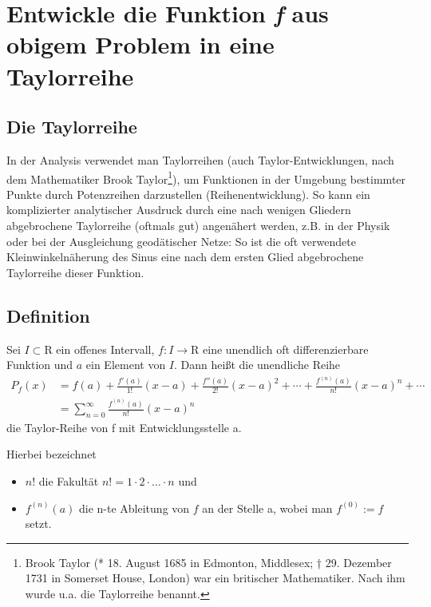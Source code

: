 \chapter{Entwickle die Funktion \emph{f} aus obigem Problem in eine Taylorreihe}

\section{Die Taylorreihe}
In der Analysis verwendet man Taylorreihen (auch Taylor-Entwicklungen, nach dem Mathematiker Brook
Taylor\footnote{Brook Taylor (* 18. August 1685 in Edmonton, Middlesex; † 29. Dezember 1731 in
Somerset House, London) war ein britischer Mathematiker. Nach ihm wurde u.a. die Taylorreihe
benannt.}), um Funktionen in der Umgebung bestimmter Punkte durch Potenzreihen darzustellen
(Reihenentwicklung). So kann ein komplizierter analytischer Ausdruck durch eine nach wenigen
Gliedern abgebrochene Taylorreihe (oftmals gut) angenähert werden, z.B. in der Physik oder bei der
Ausgleichung geodätischer Netze: So ist die oft verwendete Kleinwinkelnäherung des Sinus eine nach
dem ersten Glied abgebrochene Taylorreihe dieser Funktion.

\section{Definition}
Sei \( I \subset \mathrm{R} \) ein offenes Intervall, \( f \colon I \rightarrow \mathrm{R} \) eine
unendlich oft differenzierbare Funktion und \(a\) ein Element von \(I\). Dann heißt die unendliche
Reihe
\begin{align}
        \label{eq:taylorreihe1}
P_f(x)  & = f(a) + \frac{f'(a)}{1!} (x-a) + \frac{f''(a)}{2!} (x-a)^2 + \dotsb +
            \frac{f^{(n)}(a)}{n!} (x-a)^n + \dotsb\\
        \label{eq:taylorreihe2}
        & = \sum_{n=0}^\infty \frac{f^{(n)}(a)}{n!} (x-a)^n
\end{align}
die Taylor-Reihe von f mit Entwicklungsstelle a.

Hierbei bezeichnet
\begin{itemize}
    \item   \(n!\) die Fakultät \(n! = 1 \cdot 2 \cdot \dots \cdot n\) und
    \item   \(f^{(n)}(a)\) die n-te Ableitung von \(f\) an der Stelle a, wobei man \(f^{(0)} := f\)
            setzt.
\end{itemize}

\newpage
